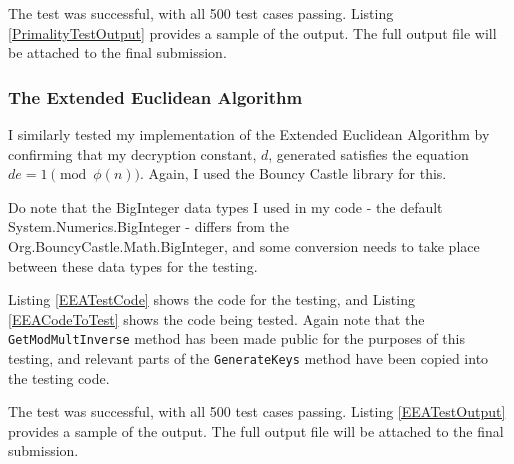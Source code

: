 \documentclass[../main.tex]{subfiles}
\begin{document}
\FloatBarrier

\FloatBarrier

\FloatBarrier

\FloatBarrier

The test was successful, with all 500 test cases passing. Listing \ref{PrimalityTestOutput} provides a sample of the output. The full output file will be attached to the final submission.

\FloatBarrier

\FloatBarrier

\subsubsection{The Extended Euclidean Algorithm}

I similarly tested my implementation of the Extended Euclidean Algorithm by confirming that my decryption constant, $d$, generated satisfies the equation $de = 1 \pmod{\phi(n)}$. Again, I used the Bouncy Castle library for this. 

Do note that the BigInteger data types I used in my code - the default System.Numerics.BigInteger - differs from the Org.BouncyCastle.Math.BigInteger, and some conversion needs to take place between these data types for the testing. 

Listing \ref{EEATestCode} shows the code for the testing, and Listing \ref{EEACodeToTest} shows the code being tested. Again note that the \texttt{GetModMultInverse} method has been made public for the purposes of this testing, and relevant parts of the \texttt{GenerateKeys} method have been copied into the testing code.

\FloatBarrier

\FloatBarrier
 
\FloatBarrier

\FloatBarrier

The test was successful, with all 500 test cases passing. Listing \ref{EEATestOutput} provides a sample of the output. The full output file will be attached to the final submission.

\FloatBarrier

\FloatBarrier
\end{document}

